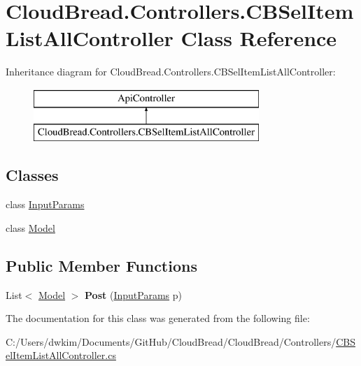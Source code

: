 \hypertarget{a00049}{}\section{Cloud\+Bread.\+Controllers.\+C\+B\+Sel\+Item\+List\+All\+Controller Class Reference}
\label{a00049}
Inheritance diagram for Cloud\+Bread.\+Controllers.\+C\+B\+Sel\+Item\+List\+All\+Controller\+:\begin{figure}[H]
\begin{center}
\leavevmode
\includegraphics[height=2.000000cm]{a00049}
\end{center}
\end{figure}
\subsection*{Classes}
\begin{DoxyCompactItemize}
\item 
class \hyperlink{a00126}{Input\+Params}
\item 
class \hyperlink{a00155}{Model}
\end{DoxyCompactItemize}
\subsection*{Public Member Functions}
\begin{DoxyCompactItemize}
\item 
List$<$ \hyperlink{a00155}{Model} $>$ {\bfseries Post} (\hyperlink{a00126}{Input\+Params} p)\hypertarget{a00049_a63d719703211c5023245d66d77ba6e5b}{}\label{a00049_a63d719703211c5023245d66d77ba6e5b}

\end{DoxyCompactItemize}


The documentation for this class was generated from the following file\+:\begin{DoxyCompactItemize}
\item 
C\+:/\+Users/dwkim/\+Documents/\+Git\+Hub/\+Cloud\+Bread/\+Cloud\+Bread/\+Controllers/\hyperlink{a00220}{C\+B\+Sel\+Item\+List\+All\+Controller.\+cs}\end{DoxyCompactItemize}
